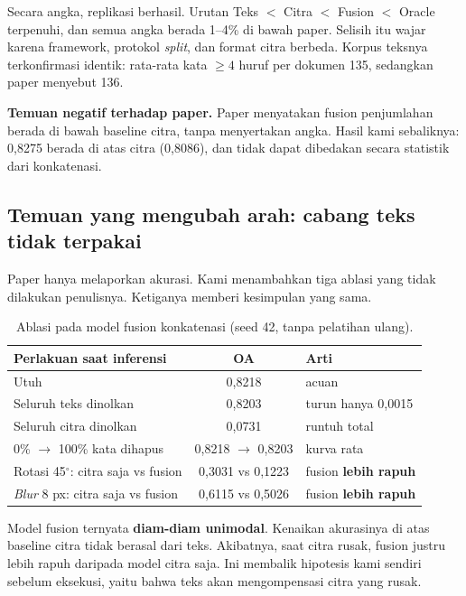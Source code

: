 \documentclass[11pt,a4paper]{article}
\begin{document}
Secara angka, replikasi berhasil. Urutan Teks $<$ Citra $<$ Fusion $<$ Oracle terpenuhi,
dan semua angka berada 1--4\% di bawah paper. Selisih itu wajar karena framework,
protokol \textit{split}, dan format citra berbeda. Korpus teksnya terkonfirmasi identik:
rata-rata kata $\geq 4$ huruf per dokumen 135, sedangkan paper menyebut 136.

\textbf{Temuan negatif terhadap paper.} Paper menyatakan fusion penjumlahan berada di
bawah baseline citra, tanpa menyertakan angka. Hasil kami sebaliknya: 0,8275 berada di
atas citra (0,8086), dan tidak dapat dibedakan secara statistik dari konkatenasi.

\subsection{Temuan yang mengubah arah: cabang teks tidak terpakai}\label{sec:temuan}

Paper hanya melaporkan akurasi. Kami menambahkan tiga ablasi yang tidak dilakukan
penulisnya. Ketiganya memberi kesimpulan yang sama.

\begin{table}[H]
\centering\small
\caption{Ablasi pada model fusion konkatenasi (seed 42, tanpa pelatihan ulang).}
\label{tab:ablasi}
\begin{tabularx}{\textwidth}{@{}p{5.6cm} c L@{}}
\toprule
Perlakuan saat inferensi & OA & Arti \\
\midrule
Utuh & 0,8218 & acuan \\
Seluruh teks dinolkan & 0,8203 & turun hanya 0,0015 \\
Seluruh citra dinolkan & 0,0731 & runtuh total \\
0\% $\rightarrow$ 100\% kata dihapus & 0,8218 $\rightarrow$ 0,8203 & kurva rata \\
Rotasi 45$^\circ$: citra saja vs fusion & 0,3031 vs 0,1223 & fusion \textbf{lebih rapuh} \\
\textit{Blur} 8 px: citra saja vs fusion & 0,6115 vs 0,5026 & fusion \textbf{lebih rapuh} \\
\bottomrule
\end{tabularx}
\end{table}

Model fusion ternyata \textbf{diam-diam unimodal}. Kenaikan akurasinya di atas baseline
citra tidak berasal dari teks. Akibatnya, saat citra rusak, fusion justru lebih rapuh
daripada model citra saja. Ini membalik hipotesis kami sendiri sebelum eksekusi, yaitu
bahwa teks akan mengompensasi citra yang rusak.
\end{document}
